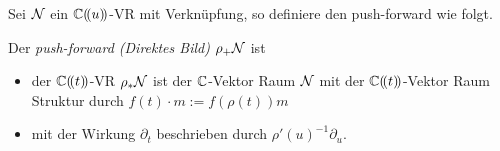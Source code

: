 \begin{comment}
wie sieht die Wirkung vom pull-back zusammenhang aus?\\
$\partial_t(f(t))m)=...=\rho'(u)^{-1}\partial_uf(t)m$
\end{comment}

Sei $\mathcal{N}$ ein $\mathbb{C}(\!(u)\!)$-VR mit Verknüpfung, so definiere den push-forward
wie folgt.
\begin{defn}
\cite[1.a]{sabbah_Fourier-local}
Der \emph{push-forward (Direktes Bild)} $\rho_+\mathcal{N}$ ist
\begin{itemize}
\item der $\mathbb{C}(\!(t)\!)$-VR $\rho_*\mathcal{N}$ ist der $\mathbb{C}$-Vektor Raum $\mathcal{N}$ mit
der $\mathbb{C}(\!(t)\!)$-Vektor Raum Struktur durch $f(t)\cdot m:=f(\rho(t))m$
\item mit der Wirkung $\partial_t$ beschrieben durch
$\rho'(u)^{-1}\partial_u$.
\end{itemize}
\end{defn}


